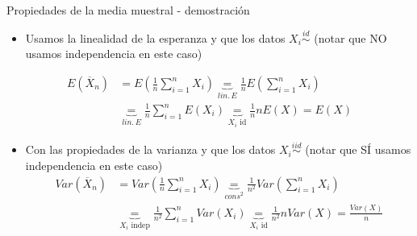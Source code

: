 \documentclass{beamer}
\theoremstyle{definition}
\begin{document}
\begin{frame}{\color{rosee}Propiedades de la media muestral - demostración} \small
    \begin{itemize}
    \item Usamos la linealidad de la esperanza y que los datos $X_i\stackrel{id}{\sim}$ (notar que NO usamos independencia en este caso)
    \end{itemize}
      \begin{align*}
        E\left(\overline{X}_{n} \right) 
        &= E\left(\frac{1}{n}\sum\limits_{i=1}^{n}X_{i} \right)\underbrace{=}_{lin. \, E}
          \frac{1}{n}E\left(\sum\limits_{i=1}^{n}X_{i} \right) \\
        &\underbrace{=}_{lin. \, E}\frac{1}{n}\sum\limits_{i=1}^{n}E\left( X_{i}\right)\underbrace{=}_{X_i \text{ id}} \frac{1}{n} n E(X) =E(X)
      \end{align*}
    \begin{itemize}
    \item Con las propiedades de la varianza y que los datos $X_i\stackrel{iid}{\sim}$ (notar que S\'I usamos independencia en este caso)
      \begin{align*}
        Var\left(\overline{X}_{n} \right) 
        &= Var\left(\frac{1}{n}\sum\limits_{i=1}^{n}X_{i} \right)
          \underbrace{=}_{cons^2}\frac{1}{n^2}Var\left(\sum\limits_{i=1}^{n}X_{i} \right)\\ 
        &\underbrace{=}_{X_i \text{ indep}}\frac{1}{n^2}\sum\limits_{i=1}^{n}Var\left( X_{i}\right)
          \underbrace{=}_{X_i \text{ id}} \frac{1}{n^{2}} n Var(X)=\frac{Var(X)}{n}
      \end{align*}
    \end{itemize}
    \vskip-0.2cm
  
\end{frame}
\end{document}
